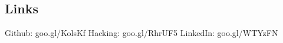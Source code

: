 \documentclass[margin,line]{resume}
\begin{document}
\begin{resume}

\section{Links}
\small Github: goo.gl/KolsKf \hfill \small Hacking: goo.gl/RhrUF5 \hfill \small LinkedIn: goo.gl/WTYzFN

\end{resume}
\end{document}
